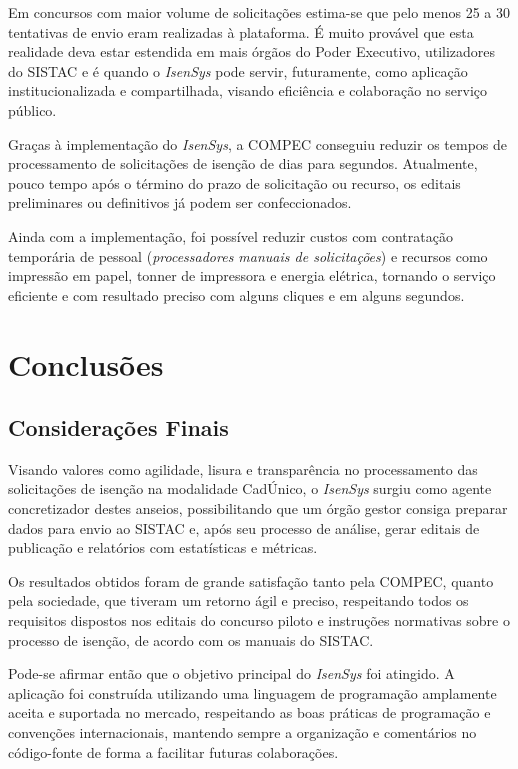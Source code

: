 \documentclass[
	12pt,			%
	openright,		%
	oneside,	
	a4paper,		%
	english,		%
	brazil			%
]{abntex2/abntex2}  %
\begin{document}
		Em concursos com maior volume de solicitações estima-se que pelo menos 25 a 30 tentativas de envio eram realizadas à plataforma. É muito provável que esta realidade deva estar estendida em mais órgãos do Poder Executivo, utilizadores do SISTAC e é quando o \textit{IsenSys} pode servir, futuramente, como aplicação institucionalizada e compartilhada, visando eficiência e colaboração no serviço público.
		
		Graças à implementação do \textit{IsenSys}, a COMPEC conseguiu reduzir os tempos de processamento de solicitações de isenção de dias para segundos. Atualmente, pouco tempo após o término do prazo de solicitação ou recurso, os editais preliminares ou definitivos já podem ser confeccionados.
		
		Ainda com a implementação, foi possível reduzir custos com contratação temporária de pessoal (\textit{processadores manuais de solicitações}) e recursos como impressão em papel, tonner de impressora e energia elétrica, tornando o serviço eficiente e com resultado preciso com alguns cliques e em alguns segundos.

	\chapter{Conclusões}
	
		\section{Considerações Finais}
	
			Visando valores como agilidade, lisura e transparência no processamento das solicitações de isenção na modalidade CadÚnico, o \textit{IsenSys} surgiu como agente concretizador destes anseios, possibilitando que um órgão gestor consiga preparar dados para envio ao SISTAC e, após seu processo de análise, gerar editais de publicação e relatórios com estatísticas e métricas.
			
			Os resultados obtidos foram de grande satisfação tanto pela COMPEC, quanto pela sociedade, que tiveram um retorno ágil e preciso, respeitando todos os requisitos dispostos nos editais do concurso piloto e instruções normativas sobre o processo de isenção, de acordo com os manuais do SISTAC.
			
			Pode-se afirmar então que o objetivo principal do \textit{IsenSys} foi atingido. A aplicação foi construída utilizando uma linguagem de programação amplamente aceita e suportada no mercado, respeitando as boas práticas de programação e convenções internacionais, mantendo sempre a organização e comentários no código-fonte de forma a facilitar futuras colaborações.
	
\end{document}
